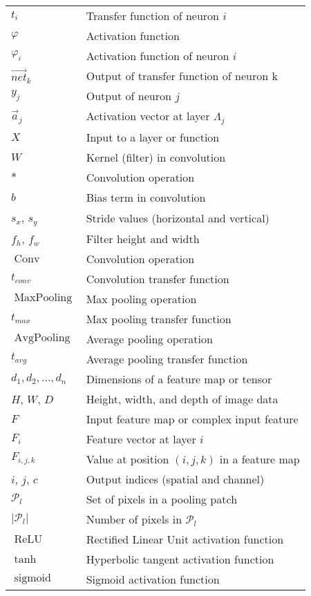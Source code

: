 \documentclass[12pt]{muthesis}
\newcommand{\act}{\varphi}
\newcommand{\net}[1][k]{\vec{net}_{#1}}
\theoremstyle{definition}
\begin{document}
\begin{longtable}{p{} p{}}
$t_i$ & Transfer function of neuron $i$ \\
$\act$ & Activation function \\
$\act_i$ & Activation function of neuron $i$ \\
$\net$ & Output of transfer function of neuron k \\
$y_j$ & Output of neuron $j$ \\
$\vec{a}_j$ & Activation vector at layer $\Lambda_j$ \\
$X$ & Input to a layer or function \\
$W$ & Kernel (filter) in convolution \\
$\ast$ & Convolution operation \\
$b$ & Bias term in convolution \\
$s_x$, $s_y$ & Stride values (horizontal and vertical) \\
$f_h$, $f_w$ & Filter height and width \\
$\operatorname{Conv}$ & Convolution operation \\
$t_{conv}$ & Convolution transfer function \\
$\operatorname{MaxPooling}$ & Max pooling operation \\
$t_{max}$ & Max pooling transfer function \\
$\operatorname{AvgPooling}$ & Average pooling operation \\
$t_{avg}$ & Average pooling transfer function \\
$d_1, d_2, \ldots, d_n$ & Dimensions of a feature map or tensor \\
$H$, $W$, $D$ & Height, width, and depth of image data \\
$F$ & Input feature map or complex input feature \\
$F_i$ & Feature vector at layer $i$ \\
$F_{i,j,k}$ & Value at position $(i,j,k)$ in a feature map \\
$i$, $j$, $c$ & Output indices (spatial and channel) \\
$\mathcal{P}_l$ & Set of pixels in a pooling patch \\
$|\mathcal{P}_l|$ & Number of pixels in $\mathcal{P}_l$ \\
$\operatorname{ReLU}$ & Rectified Linear Unit activation function \\
$\operatorname{tanh}$ & Hyperbolic tangent activation function \\
$\operatorname{sigmoid}$ & Sigmoid activation function \\

\end{longtable}
\end{document}
